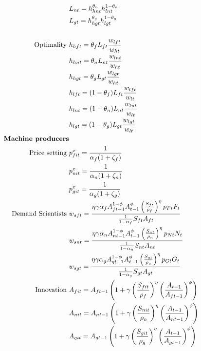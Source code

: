 \begin{align}
& L_{nt}=h_{hnt}^{\theta_{n}}h_{lnt}^{1-\theta_{n}}\\
& L_{gt}=h_{hgt}^{\theta_{g}}h_{lgt}^{1-\theta_{g}}\\
\ \\
\text{Optimality}\ \vspace{4mm}& h_{hft}= \theta_{f}L_{ft}\frac{w_{lft}}{w_{ht}}\label{eq:opt_lab_pro}\\
& h_{hnt}= \theta_{n}L_{nt}\frac{w_{lnt}}{w_{ht}}\\
& h_{hgt}= \theta_{g}L_{gt}\frac{w_{lgt}}{w_{ht}}\\
& h_{lft}= (1-\theta_{f})L_{ft}\frac{w_{lft}}{w_{lt}}\label{eq:opt_lab_pro_low}\\
& h_{lnt}= (1-\theta_{n}) L_{nt}\frac{w_{lnt}}{w_{lt}}\\
& h_{lgt}= (1-\theta_{g}) L_{gt}\frac{w_{lgt}}{w_{lt}}\\
%
\text{\textbf{Machine producers}}\\
\text{Price setting}\ \vspace{4mm}&p_{fit}^x=\frac{1}{\alpha_f(1+\zeta_f)}\\
&p_{nit}^x=\frac{1}{\alpha_n(1+\zeta_n)}\\
&p_{git}^x=\frac{1}{\alpha_g(1+\zeta_g)}
\\ 
\text{Demand Scientists}\ \vspace{4mm}&
w_{sft}=\frac{\eta \gamma \alpha_f A_{ft-1}^{1-\phi}A_{t-1}^{\phi}\left(\frac{S_{ft}}{\rho_f}\right)^{\eta}p_{Ft}F_t}{\frac{1}{1-\alpha_f}S_{ft}A_{ft}}\label{eq:demand_sc}\\
&
w_{snt}=\frac{\eta \gamma \alpha_n A_{nt-1}^{1-\phi}A_{t-1}^{\phi}\left(\frac{S_{nt}}{\rho_n}\right)^{\eta}p_{Nt}N_t}{\frac{1}{1-\alpha_n}S_{nt}A_{nt}}\\
&
w_{sgt}=\frac{\eta \gamma \alpha_g A_{gt-1}^{1-\phi}A_{t-1}^{\phi}\left(\frac{S_{gt}}{\rho_g}\right)^{\eta}p_{Gt}G_t}{\frac{1}{1-\alpha_g}S_{gt}A_{gt}}\\
\text{Innovation}\ \vspace{4mm}&
A_{fit}=A_{ft-1}\left(1+\gamma\left(\frac{S_{fit}}{\rho_f}\right)^{\eta}\left(\frac{A_{t-1}}{A_{ft-1}}\right)^{\phi}\right) \\
&
A_{nit}=A_{nt-1}\left(1+\gamma\left(\frac{S_{nit}}{\rho_n}\right)^{\eta}\left(\frac{A_{t-1}}{A_{nt-1}}\right)^{\phi}\right) \\
&
A_{git}=A_{gt-1}\left(1+\gamma\left(\frac{S_{git}}{\rho_g}\right)^{\eta}\left(\frac{A_{t-1}}{A_{gt-1}}\right)^{\phi}\right) \\

\end{align}
